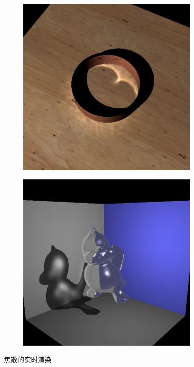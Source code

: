 \begin{figure}
\sidecaption
	\begin{subfigure}[b]{.315\textwidth}
		\includegraphics[width=1.0\textwidth]{figures/ir/ir-3-4}
	\end{subfigure}
	\begin{subfigure}[b]{.315\textwidth}
		\includegraphics[width=1.0\textwidth]{figures/ir/ir-3-5}
	\end{subfigure}
\caption{焦散的实时渲染}
\label{f:ir-non-diffuse-surfaces}
\end{figure}

